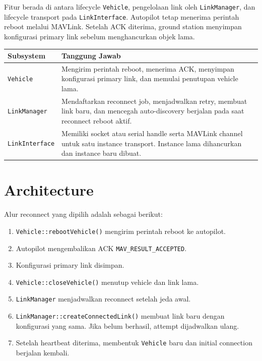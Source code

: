 \documentclass[11pt,a4paper]{article}
\begin{document}
Fitur berada di antara lifecycle \texttt{Vehicle}, pengelolaan link oleh
\texttt{LinkManager}, dan lifecycle transport pada \texttt{LinkInterface}.
Autopilot tetap menerima perintah reboot melalui MAVLink. Setelah ACK diterima,
ground station menyimpan konfigurasi primary link sebelum menghancurkan objek lama.

\begin{table}[H]
\centering
\begin{tabularx}{\textwidth}{l Y}
\toprule
\textbf{Subsystem} & \textbf{Tanggung Jawab} \\
\midrule
\texttt{Vehicle} &
Mengirim perintah reboot, menerima ACK, menyimpan konfigurasi primary link, dan
memulai penutupan vehicle lama. \\
\midrule
\texttt{LinkManager} &
Mendaftarkan reconnect job, menjadwalkan retry, membuat link baru, dan mencegah
auto-discovery berjalan pada saat reconnect reboot aktif. \\
\midrule
\texttt{LinkInterface} &
Memiliki socket atau serial handle serta MAVLink channel untuk satu instance
transport. Instance lama dihancurkan dan instance baru dibuat. \\

\bottomrule
\end{tabularx}
\end{table}

\section{Architecture}

Alur reconnect yang dipilih adalah sebagai berikut:

\begin{enumerate}
    \item \nolinkurl{Vehicle::rebootVehicle()} mengirim perintah reboot ke autopilot.
    \item Autopilot mengembalikan ACK \nolinkurl{MAV_RESULT_ACCEPTED}.
    \item Konfigurasi primary link disimpan.
    \item \texttt{Vehicle::closeVehicle()} menutup vehicle dan link lama.
    \item \texttt{LinkManager} menjadwalkan reconnect setelah jeda awal.
    \item \nolinkurl{LinkManager::createConnectedLink()} membuat link baru dengan
          konfigurasi yang sama. Jika belum berhasil, attempt dijadwalkan ulang.
    \item Setelah heartbeat diterima, membentuk
          \texttt{Vehicle} baru dan initial connection berjalan kembali.
\end{enumerate}
\end{document}
